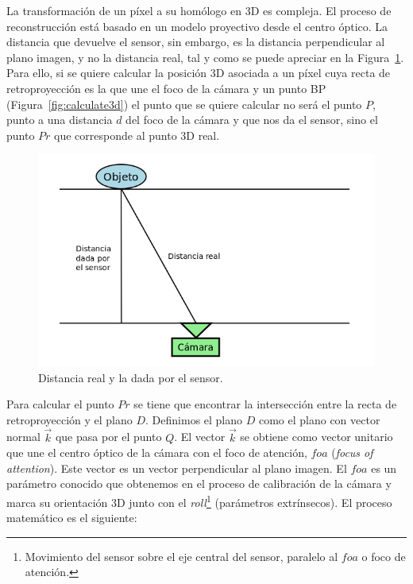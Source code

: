La transformación de un píxel a su homólogo en 3D es compleja. El proceso de reconstrucción está basado en un modelo proyectivo desde el centro óptico. La distancia que devuelve el sensor, sin embargo, es la distancia perpendicular al plano imagen, y no la distancia real, tal y como se puede apreciar en la Figura~\ref{fig:distPoint}. Para ello, si se quiere calcular la posición 3D asociada a un píxel cuya recta de retroproyección es la que une el foco de la cámara y un punto BP (Figura~\ref{fig:calculate3d}) el punto que se quiere calcular no será el punto $P$, punto a una distancia $d$ del foco de la cámara y que nos da el sensor, sino el punto $Pr$ que corresponde al punto 3D real.

\begin{figure}[th]
\centering
\includegraphics[scale=0.4]{Figures/dist-point.png}
\decoRule
\caption[Distancia real y la dada por el sensor]{Distancia real y la dada por el sensor.}
\label{fig:distPoint}
\end{figure}

Para calcular el punto $Pr$ se tiene que encontrar la intersección entre la recta de retroproyección y el plano $D$. Definimos el plano $D$ como el plano con vector normal $\vec{k}$ que pasa por el punto $Q$. El vector $\vec{k}$ se obtiene como vector unitario que une el centro óptico de la cámara con el foco de atención, $foa$ (\textit{focus of attention}). Este vector es un vector perpendicular al plano imagen. El $foa$ es un parámetro conocido que obtenemos en el proceso de calibración de la cámara y marca su orientación 3D junto con el \textit{roll}\footnote{Movimiento del sensor sobre el eje central del sensor, paralelo al $foa$ o foco de atención.} (parámetros extrínsecos). El proceso matemático es el siguiente:

